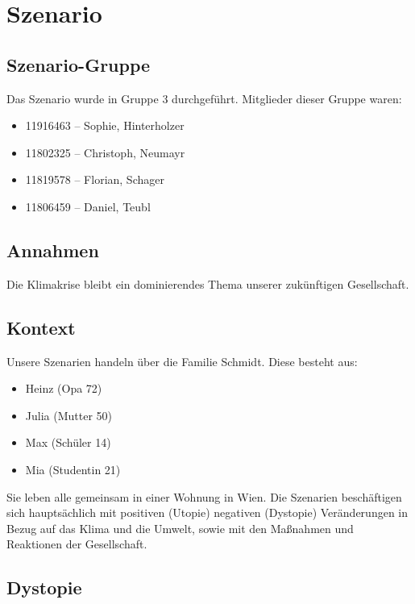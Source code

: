 \documentclass[twoside, a4paper, DIV=11, open=any, bibliography=totoc]{scrbook}
\begin{document}
\chapter{Szenario} \label{chap:szenario}

\section{Szenario-Gruppe} \label{sec:szengruppe}

Das Szenario wurde in Gruppe 3 durchgeführt. Mitglieder dieser Gruppe waren:

\begin{itemize}
    \item 11916463 – Sophie, Hinterholzer
    \item 11802325 – Christoph, Neumayr
    \item 11819578 – Florian, Schager
    \item 11806459 – Daniel, Teubl
\end{itemize}

\section{Annahmen} \label{sec:szenannahmen}

Die Klimakrise bleibt ein dominierendes Thema unserer zukünftigen Gesellschaft.

\section{Kontext} \label{sec:szenkontext}

Unsere Szenarien handeln über die Familie Schmidt. Diese besteht aus:
\begin{itemize}
    \item Heinz (Opa 72)
    \item Julia (Mutter 50)
    \item Max (Schüler 14)
    \item Mia (Studentin 21)
\end{itemize}
Sie leben alle gemeinsam in einer Wohnung in Wien. 
Die Szenarien beschäftigen sich hauptsächlich mit positiven (Utopie) 
negativen (Dystopie) Veränderungen in Bezug auf das Klima und die Umwelt,
sowie mit den Maßnahmen und Reaktionen der Gesellschaft.


\section{Dystopie} \label{sec:szendystopie}
\end{document}
